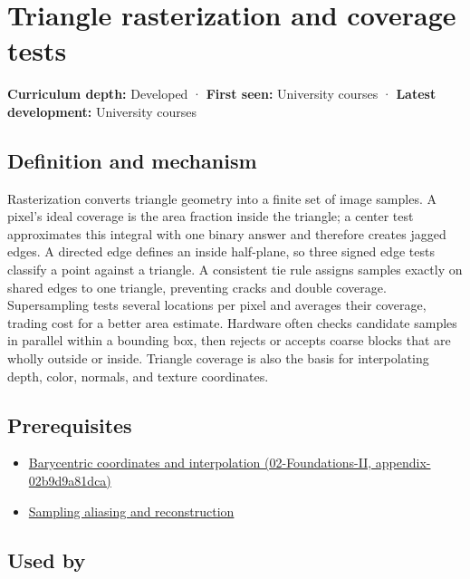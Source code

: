 \hypertarget{appendix-ed3f9bc298fe}{}
\section{Triangle rasterization and coverage tests}\label{appendix-ed3f9bc298fe-triangle-rasterization-and-coverage-tests}

\textbf{Curriculum depth:} Developed · \textbf{First seen:} University courses · \textbf{Latest development:} University courses

\subsection{Definition and mechanism}\label{appendix-ed3f9bc298fe-definition-and-mechanism}

Rasterization converts triangle geometry into a finite set of image samples. A pixel's ideal coverage is the area fraction inside the triangle; a center test approximates this integral with one binary answer and therefore creates jagged edges. A directed edge defines an inside half-plane, so three signed edge tests classify a point against a triangle. A consistent tie rule assigns samples exactly on shared edges to one triangle, preventing cracks and double coverage. Supersampling tests several locations per pixel and averages their coverage, trading cost for a better area estimate. Hardware often checks candidate samples in parallel within a bounding box, then rejects or accepts coarse blocks that are wholly outside or inside. Triangle coverage is also the basis for interpolating depth, color, normals, and texture coordinates.

\subsection{Prerequisites}\label{appendix-ed3f9bc298fe-prerequisites}

\begin{itemize}
\tightlist
\item
  \href{../02-Foundations-II/main.pdf\#nameddest=appendix-02b9d9a81dca}{Barycentric coordinates and interpolation (02-Foundations-II, appendix-02b9d9a81dca)}
\item
  \hyperref[appendix-6a7869dd79a6]{Sampling aliasing and reconstruction}
\end{itemize}

\subsection{Used by}\label{appendix-ed3f9bc298fe-used-by}

